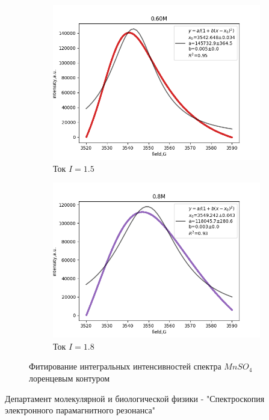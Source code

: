 \documentclass{article}
\begin{document}
\begin{figure}[h!]
  \begin{subfigure}[b]{0.3\linewidth}
    \includegraphics[width=\linewidth]{2.1/24.png}
    \caption{Ток $I = 1.5$}
  \end{subfigure}
  \begin{subfigure}[b]{0.3\linewidth}
    \includegraphics[width=\linewidth]{2.1/25.png}
    \caption{Ток $I = 1.8$}
  \end{subfigure}

  \caption{Фитирование интегральных интенсивностей спектра $MnSO_4$ лоренцевым контуром}
  \label{2__}
\end{figure}





\begin{thebibliography}{}
      Департамент молекулярной и биологической физики -  "Спектроскопия электронного парамагнитного резонанса"
\end{thebibliography}
\end{document}
